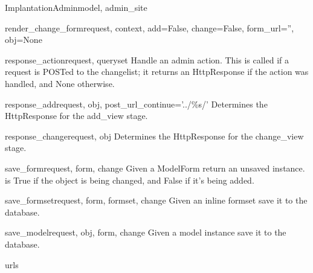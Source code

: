 \documentclass[letterpaper,10pt,english]{sphinxmanual}
\begin{document}
\begin{classdesc}{ImplantationAdmin}{model, admin\_site}
\hypertarget{data.admin.ImplantationAdmin.render_change_form}{}\begin{methoddesc}{render\_change\_form}{request, context, add=False, change=False, form\_url='', obj=None}\end{methoddesc}

\hypertarget{data.admin.ImplantationAdmin.response_action}{}\begin{methoddesc}{response\_action}{request, queryset}
Handle an admin action. This is called if a request is POSTed to the
changelist; it returns an HttpResponse if the action was handled, and
None otherwise.
\end{methoddesc}

\hypertarget{data.admin.ImplantationAdmin.response_add}{}\begin{methoddesc}{response\_add}{request, obj, post\_url\_continue='../\%s/'}
Determines the HttpResponse for the add\_view stage.
\end{methoddesc}

\hypertarget{data.admin.ImplantationAdmin.response_change}{}\begin{methoddesc}{response\_change}{request, obj}
Determines the HttpResponse for the change\_view stage.
\end{methoddesc}

\hypertarget{data.admin.ImplantationAdmin.save_form}{}\begin{methoddesc}{save\_form}{request, form, change}
Given a ModelForm return an unsaved instance.  is True if
the object is being changed, and False if it's being added.
\end{methoddesc}

\hypertarget{data.admin.ImplantationAdmin.save_formset}{}\begin{methoddesc}{save\_formset}{request, form, formset, change}
Given an inline formset save it to the database.
\end{methoddesc}

\hypertarget{data.admin.ImplantationAdmin.save_model}{}\begin{methoddesc}{save\_model}{request, obj, form, change}
Given a model instance save it to the database.
\end{methoddesc}

\hypertarget{data.admin.ImplantationAdmin.urls}{}\begin{memberdesc}{urls}\end{memberdesc}
\end{classdesc}
\end{document}
